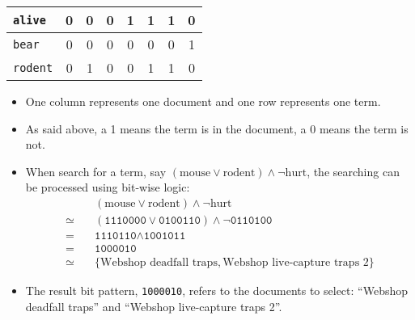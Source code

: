 \begin{table}[H]
\begin{tabular}{|l|c|c|c|c|c|c|c|}
        			\texttt{alive}  & \textcolor{irl}{0} & \textcolor{irl}{0} & \textcolor{irl}{0} &         1          &         1          &         1          & \textcolor{irl}{0} \\ \hline
        			\texttt{bear}   & \textcolor{irl}{0} & \textcolor{irl}{0} & \textcolor{irl}{0} & \textcolor{irl}{0} & \textcolor{irl}{0} & \textcolor{irl}{0} &         1          \\ \hline
        			\texttt{rodent} & \textcolor{irl}{0} &         1          & \textcolor{irl}{0} & \textcolor{irl}{0} &         1          &         1          & \textcolor{irl}{0} \\ \hline
        		\end{tabular}
        	\end{table}
            \begin{itemize}
            	\item One column represents one document and one row represents one term.
            	\item As said above, a 1 means the term is in the document, a 0 means the term is not.
            	\item When search for a term, say \( (\text{mouse} \lor \text{rodent}) \land \lnot\text{hurt} \), the searching can be processed using bit-wise logic:
            		\begin{align*}
	            		       & \quad (\text{mouse} \lor \text{rodent}) \land \lnot\text{hurt} \\
	            		\simeq & \quad (\texttt{1110000} \lor \texttt{0100110}) \land \lnot\texttt{0110100} \\
	            		     = & \quad \texttt{1110110} \land \texttt{1001011} \\
	            		     = & \quad \texttt{1000010} \\
	            		\simeq & \quad \{ \text{Webshop deadfall traps}, \text{Webshop live-capture traps 2} \}
            		\end{align*}
            	\item The result bit pattern, \texttt{1000010}, refers to the documents to select: \enquote{Webshop deadfall traps} and \enquote{Webshop live-capture traps 2}.
            \end{itemize}

